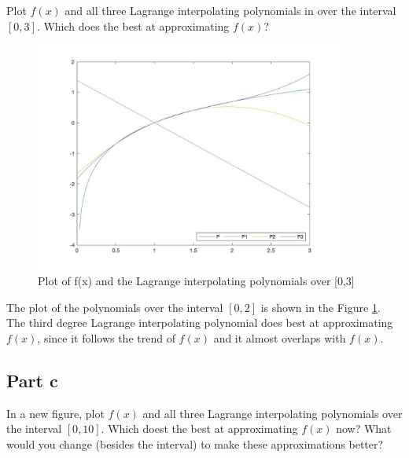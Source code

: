 \begin{question}
    Plot $f(x)$ and all three Lagrange interpolating polynomials in \MATLAB over the interval $[0,3]$. Which does the best at approximating $f(x)$?
\end{question}

\begin{answer}
    \begin{figure}[H]
        \centering
        \includegraphics[width=0.9\textwidth]{Figure 5.jpg}
        \caption{\label{fig:fig5}Plot of f(x) and the Lagrange interpolating polynomials over [0,3]}
    \end{figure}
    The plot of the polynomials over the interval $[0,2]$ is shown in the Figure \ref{fig:fig5}. The third degree Lagrange interpolating polynomial does best at approximating $f(x)$, since it follows the trend of $f(x)$ and it almost overlaps with $f(x)$.
\end{answer}

\subsection{Part c}

\begin{question}
    In a new figure, plot $f(x)$ and all three Lagrange interpolating polynomials over the interval $[0,10]$. Which doest the best at approximating $f(x)$ now? What would you change (besides the interval) to make these approximations better?
\end{question}


